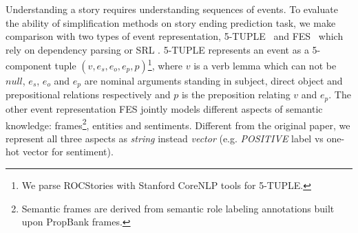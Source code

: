 \begin{table}[th!]
\small
\centering
{}
\caption{Effects of simplification using different types of
events on the length of the word sequence. 
Before = avg. num of words before simplify,
After = avg. num of words after simplify, Events = avg. num of events
extracted.}
\label{tab:size}
\end{table}



Understanding a story requires understanding sequences of events. 
To evaluate the ability of 
simplification methods on story ending prediction task, we make comparison with
 two types of event representation, 5-TUPLE~\cite{pichotta2016learning} and FES~\cite{peng2017joint}
  which rely on dependency parsing or SRL . 
  5-TUPLE represents an event as a 5-component tuple $(v, e_s, e_o, e_p, p)
  $\footnote{We  parse ROCStories with Stanford CoreNLP tools for 5-TUPLE.}, 
  where $v$ is a verb lemma which can not be $null$, $e_s$, $e_o$ and $e_p$ are nominal 
  arguments standing in subject, direct object and prepositional 
  relations respectively and $p$ is the preposition relating $v$ and $e_p$. 
The other event representation FES jointly models different aspects of 
semantic knowledge: frames\footnote{Semantic frames 
are derived from semantic role labeling annotations built upon PropBank frames. }, 
entities and sentiments. 
Different from the original paper, we represent all three aspects 
as \textit{string} instead \textit{vector} (e.g. \textit{POSITIVE} 
label vs one-hot vector for sentiment).

